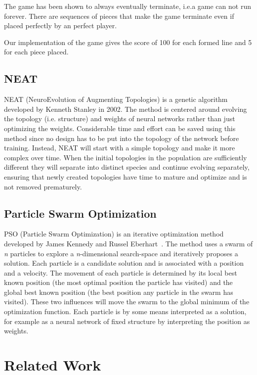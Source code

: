 \documentclass{article}
\begin{document}
The game has been shown to always eventually terminate, i.e.\@ a game can not run forever\cite{TetrisLose}.
There are sequences of pieces that make the game terminate even if placed perfectly by an perfect player.

Our implementation of the game gives the score of 100 for each formed line and 5 for each piece placed.

\subsection{NEAT}
NEAT (NeuroEvolution of Augmenting Topologies) is a genetic algorithm developed by Kenneth Stanley in 2002\cite{NEAT}. The method is centered around evolving the topology (i.e. structure) and weights of neural networks rather than just optimizing the weights. Considerable time and effort can be saved using this method since no design has to be put into the topology of the network before training\cite{NEAT}. Instead, NEAT will start with a simple topology and make it more complex over time. When the initial topologies in the population are sufficiently different they will separate into distinct species and continue evolving separately, ensuring that newly created topologies have time to mature and optimize and is not removed prematurely\cite{NEATLearning}.

\subsection{Particle Swarm Optimization}
PSO (Particle Swarm Optimization) is an iterative optimization method developed by James Kennedy and Russel Eberhart~\cite{PSO}. The method uses a swarm of \textit{n} particles to explore a \textit{n}-dimensional search-space and iteratively proposes a solution. Each particle is a candidate solution and is associated with a position and a velocity. The movement of each particle is determined by its local best known position (the most optimal position the particle has visited) and the global best known position (the best position any particle in the swarm has visited). These two influences will move the swarm to the global minimum of the optimization function. Each particle is by some means interpreted as a solution, for example as a neural network of fixed structure by interpreting the position as weights.

\section{Related Work}
\end{document}
